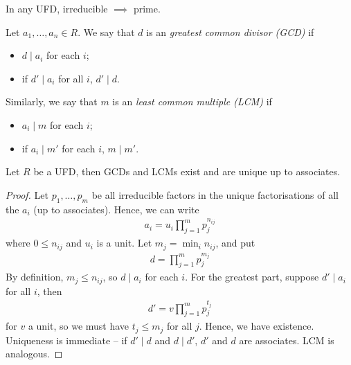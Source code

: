 \documentclass{../../template/note}
\begin{document}
    \begin{remark*}
        In any UFD, irreducible $\implies$ prime.
    \end{remark*}
    
    \begin{definition}
        Let $a_1, \dots, a_n \in R$. We say that $d$ is an \emph{greatest common divisor (GCD)} if
        \begin{itemize}
            \item $d \mid a_i$ for each $i$;
            \item if $d' \mid a_i$ for all $i$, $d' \mid d$.
        \end{itemize}
        Similarly, we say that $m$ is an \emph{least common multiple (LCM)} if
        \begin{itemize}
            \item $a_i \mid m$ for each $i$;
            \item if $a_i \mid m'$ for each $i$, $m \mid m'$.
        \end{itemize}
    \end{definition}
    
    \begin{theorem}
        Let $R$ be a UFD, then GCDs and LCMs exist and are unique up to associates.
    \end{theorem}
    
    \begin{proof}
        Let $p_1, \dots, p_m$ be all irreducible factors in the unique factorisations of all the $a_i$ (up to associates). Hence, we can write
        \begin{align*}
            a_i = u_i \prod_{j=1}^m p_j^{n_{ij}}
        \end{align*}
        where $0 \leq n_{ij}$ and $u_i$ is a unit. Let $m_j = \min_i n_{ij}$, and put
        \begin{align*}
            d = \prod_{j=1}^m p_j^{m_j}
        \end{align*}
        By definition, $m_j \leq n_{ij}$, so $d \mid a_i$ for each $i$. For the greatest part, suppose $d' \mid a_i$ for all $i$, then
        \begin{align*}
            d' = v \prod_{j=1}^m p_j^{t_j}
        \end{align*}
        for $v$ a unit, so we must have $t_j \leq m_j$ for all $j$. Hence, we have existence. Uniqueness is immediate -- if $d' \mid d$ and $d \mid d'$, $d'$ and $d$ are associates. LCM is analogous.       
    \end{proof}
    
\end{document}
